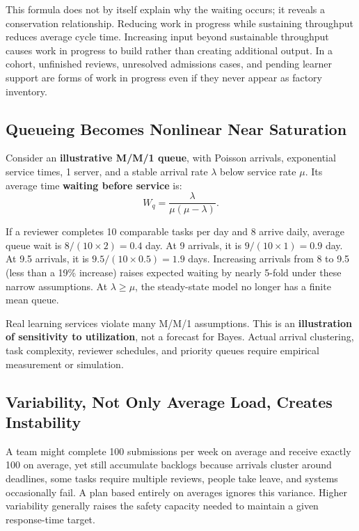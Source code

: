 This formula does not by itself explain why the waiting occurs; it reveals a conservation relationship. Reducing work in progress while sustaining throughput reduces average cycle time. Increasing input beyond sustainable throughput causes work in progress to build rather than creating additional output. In a cohort, unfinished reviews, unresolved admissions cases, and pending learner support are forms of work in progress even if they never appear as factory inventory.

\subsection{Queueing Becomes Nonlinear Near Saturation}
\label{sec:queueing_nonlinear_saturation}

Consider an \textbf{illustrative M/M/1 queue}, with Poisson arrivals, exponential service times, 1 server, and a stable arrival rate $\lambda$ below service rate $\mu$. Its average time \textbf{waiting before service} is:
\begin{equation}
\label{eq:mm1_waiting_time}
W_q = \frac{\lambda}{\mu(\mu-\lambda)}.
\end{equation}

If a reviewer completes 10 comparable tasks per day and 8 arrive daily, average queue wait is $8/(10 \times 2) = 0.4$ day. At 9 arrivals, it is $9/(10 \times 1) = 0.9$ day. At 9.5 arrivals, it is $9.5/(10 \times 0.5) = 1.9$ days. Increasing arrivals from 8 to 9.5 (less than a 19\% increase) raises expected waiting by nearly 5-fold under these narrow assumptions. At $\lambda \ge \mu$, the steady-state model no longer has a finite mean queue.

Real learning services violate many M/M/1 assumptions. This is an \textbf{illustration of sensitivity to utilization}, not a forecast for Bayes. Actual arrival clustering, task complexity, reviewer schedules, and priority queues require empirical measurement or simulation.

\subsection{Variability, Not Only Average Load, Creates Instability}
\label{sec:variability_creates_instability}

A team might complete 100 submissions per week on average and receive exactly 100 on average, yet still accumulate backlogs because arrivals cluster around deadlines, some tasks require multiple reviews, people take leave, and systems occasionally fail. A plan based entirely on averages ignores this variance. Higher variability generally raises the safety capacity needed to maintain a given response-time target.

